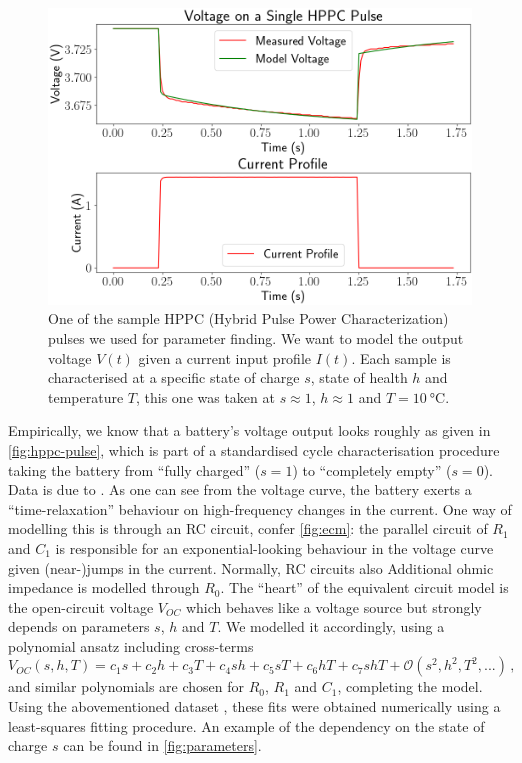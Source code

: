 \documentclass{prettytex/ox/mmsc-special-topic}
\begin{document}
  \begin{figure}[H]
    \centering
    \includegraphics[width=0.6\linewidth]{figures/hppc-pulse.png}
    \caption{One of the sample HPPC (Hybrid Pulse Power Characterization) pulses we used for parameter finding. We want to model the output voltage $V(t)$ given a current input profile $I(t)$. Each sample is characterised at a specific state of charge $s$, state of health $h$ and temperature $T$, this one was taken at $s \approx 1$, $h \approx 1$ and $T = \SI{10}{\degreeCelsius}$.}
    \label{fig:hppc-pulse}
  \end{figure}

  Empirically, we know that a battery's voltage output looks roughly as given in \autoref{fig:hppc-pulse}, which is part of a standardised cycle characterisation procedure taking the battery from ``fully charged'' ($s=1$) to ``completely empty'' ($s=0$). Data is due to \cite{panasonicnums}.
  As one can see from the voltage curve, the battery exerts a ``time-relaxation'' behaviour on high-frequency changes in the current.
  One way of modelling this is through an RC circuit, confer \autoref{fig:ecm}: the parallel circuit of $R_1$ and $C_1$ is responsible for an exponential-looking behaviour in the voltage curve given (near-)jumps in the current.
  Normally, RC circuits also
  Additional ohmic impedance is modelled through $R_0$.
  The ``heart'' of the equivalent circuit model is the open-circuit voltage $V_{OC}$ which behaves like a voltage source but strongly depends on parameters $s$, $h$ and $T$.
  We modelled it accordingly, using a polynomial ansatz including cross-terms $$V_{OC}(s, h, T) = c_1 s + c_2 h + c_3 T + c_4 sh + c_5 sT + c_6 hT + c_7 shT + \mathcal{O}(s^2, h^2, T^2, ...)\,,$$
  and similar polynomials are chosen for $R_0$, $R_1$ and $C_1$, completing the model.
  Using the abovementioned dataset \parencite{panasonicnums}, these fits were obtained numerically using a least-squares fitting procedure. An example of the dependency on the state of charge $s$ can be found in \autoref{fig:parameters}.
\end{document}
